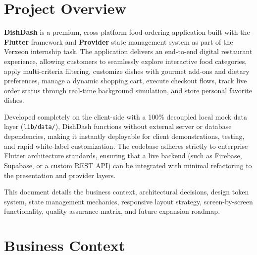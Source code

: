 \documentclass[11pt,a4paper]{article}
\begin{document}
\newpage
\tableofcontents
\newpage
{}

\section{Project Overview}

\textbf{DishDash} is a premium, cross-platform food ordering application built with the \textbf{Flutter} framework and \textbf{Provider} state management system as part of the Verxeon internship task. The application delivers an end-to-end digital restaurant experience, allowing customers to seamlessly explore interactive food categories, apply multi-criteria filtering, customize dishes with gourmet add-ons and dietary preferences, manage a dynamic shopping cart, execute checkout flows, track live order status through real-time background simulation, and store personal favorite dishes.

Developed completely on the client-side with a 100\% decoupled local mock data layer (\texttt{lib/\allowbreak data/}), DishDash functions without external server or database dependencies, making it instantly deployable for client demonstrations, testing, and rapid white-label customization. The codebase adheres strictly to enterprise Flutter architecture standards, ensuring that a live backend (such as Firebase, Supabase, or a custom REST API) can be integrated with minimal refactoring to the presentation and provider layers.

This document details the business context, architectural decisions, design token system, state management mechanics, responsive layout strategy, screen-by-screen functionality, quality assurance matrix, and future expansion roadmap.

\FloatBarrier

\section{Business Context}
\end{document}
